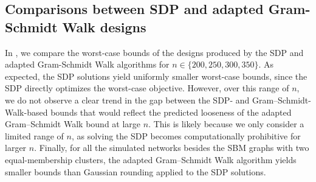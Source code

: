 \documentclass[12pt]{article}
\theoremstyle{definition}
\numberwithin{equation}{section}
\numberwithin{figure}{section}
\numberwithin{equation}{section}
\numberwithin{figure}{section}
\begin{document}
\subsection{Comparisons between SDP and adapted Gram-Schmidt Walk designs}
In , we compare the worst-case bounds of the designs produced by the SDP and adapted Gram-Schmidt Walk algorithms for $n \in \{200, 250, 300, 350\}$. As expected, the SDP solutions yield uniformly smaller worst-case bounds, since the SDP directly optimizes the worst-case objective. However, over this range of $n$, we do not observe a clear trend in the gap between the SDP- and Gram–Schmidt-Walk-based bounds that would reflect the predicted looseness of the adapted Gram–Schmidt Walk bound at large $n$. This is likely because we only consider a limited range of $n$, as solving the SDP becomes computationally prohibitive for larger $n$. Finally, for all the simulated networks besides the SBM graphs with two equal-membership clusters, the adapted Gram–Schmidt Walk algorithm yields smaller bounds than Gaussian rounding applied to the SDP solutions.
\end{document}

